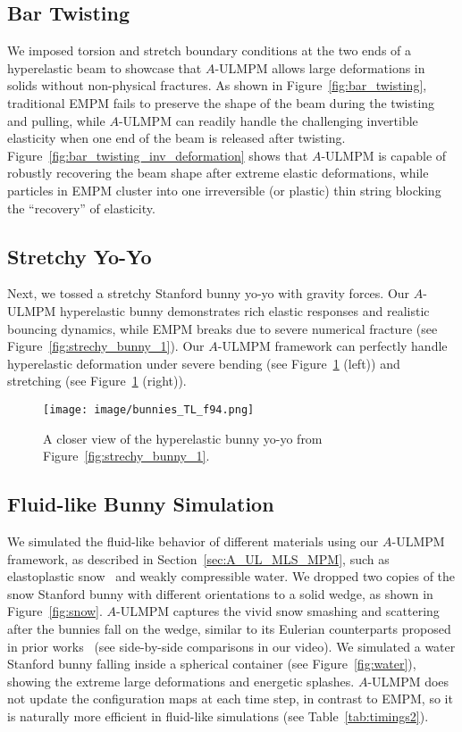 \subsection{Bar Twisting}
We imposed torsion and stretch boundary conditions at the two ends of a hyperelastic beam to showcase that $A$-ULMPM allows large deformations in solids without non-physical fractures. As shown in Figure~\ref{fig:bar_twisting}, traditional EMPM fails to preserve the shape of the beam during the twisting and pulling, while $A$-ULMPM can readily handle the challenging invertible elasticity when one end of the beam is released after twisting. Figure~\ref{fig:bar_twisting_inv_deformation} shows that $A$-ULMPM is capable of robustly recovering the beam shape after extreme elastic deformations, while particles in EMPM cluster into one irreversible (or plastic) thin string blocking the ``recovery''  of elasticity. 
\vspace{-1.5mm}
\subsection{Stretchy Yo-Yo} 
Next, we tossed a stretchy Stanford bunny yo-yo with gravity forces. Our $A$-ULMPM hyperelastic bunny demonstrates rich elastic responses and realistic bouncing dynamics, while EMPM breaks due to severe numerical fracture (see Figure~\ref{fig:strechy_bunny_1}). 
Our $A$-ULMPM framework can perfectly handle hyperelastic deformation under severe bending (see Figure~\ref{fig:strechy_bunny_zoom_in} (left)) and stretching (see Figure~\ref{fig:strechy_bunny_zoom_in} (right)).
\begin{figure}[h!]
 \vspace{-4mm}
    \centering
    \texttt{[image: image/bunnies\_TL\_f94.png]}
     \vspace{-7.5mm}
    \caption{A closer view of the hyperelastic bunny yo-yo from Figure~\ref{fig:strechy_bunny_1}.}
    \label{fig:strechy_bunny_zoom_in}
    \vspace{-5mm}
\end{figure}
\subsection{Fluid-like Bunny Simulation} 
We simulated the fluid-like behavior of different materials using our $A$-ULMPM framework, as described in Section~\ref{sec:A_UL_MLS_MPM}, such as elastoplastic snow~\cite{Stomakhin:2013:MPMsnow} and weakly compressible water. 
We dropped two copies of the snow Stanford bunny with different orientations to a solid wedge, as shown in Figure~\ref{fig:snow}. $A$-ULMPM captures the vivid snow smashing and scattering after the bunnies fall on the wedge, similar to its Eulerian counterparts proposed in prior works~\cite{Stomakhin:2013:MPMsnow} (see side-by-side comparisons in our video). 
We simulated a water Stanford bunny falling inside a spherical container (see Figure~\ref{fig:water}), showing the extreme large deformations and energetic splashes.   
 $A$-ULMPM does not update the configuration maps at each time step, in contrast to EMPM, so it is naturally more efficient in fluid-like simulations (see Table~\ref{tab:timings2}).
 
